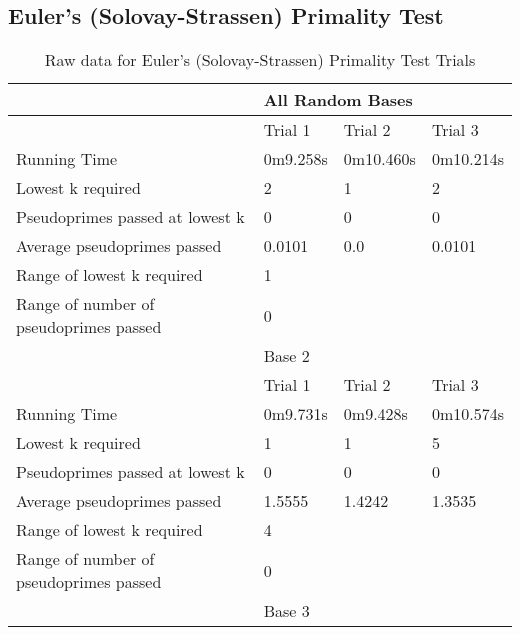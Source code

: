 \documentclass{article}
\begin{document}
\begin{appendices}
\subsection{Euler's (Solovay-Strassen) Primality Test}
\FloatBarrier
\begin{longtable}{llll}
\caption{Raw data for Euler's (Solovay-Strassen) Primality Test Trials\label{table:euler}}\\ 
\toprule
                                       & \multicolumn{3}{l}{All Random Bases}   \\
\midrule
                                       & Trial 1   & Trial 2   & Trial 3        \\
Running Time                           & 0m9.258s  & 0m10.460s & 0m10.214s      \\
Lowest k required                      & 2         & 1         & 2              \\
Pseudoprimes passed at lowest k        & 0         & 0         & 0              \\
Average pseudoprimes passed            & 0.0101    & 0.0       & 0.0101         \\
\cmidrule(lr){2-2}\cmidrule(lr){3-3}\cmidrule(lr){4-4}
Range of lowest k required             & \multicolumn{3}{l}{1}                  \\
Range of number of pseudoprimes passed & \multicolumn{3}{l}{0}                  \\
\midrule
                                       & \multicolumn{3}{l}{Base 2}             \\
\midrule
                                       & Trial 1   & Trial 2   & Trial 3        \\
Running Time                           & 0m9.731s  & 0m9.428s  & 0m10.574s      \\
Lowest k required                      & 1         & 1         & 5              \\
Pseudoprimes passed at lowest k        & 0         & 0         & 0              \\
Average pseudoprimes passed            & 1.5555    & 1.4242    & 1.3535         \\
\cmidrule(lr){2-2}\cmidrule(lr){3-3}\cmidrule(lr){4-4}
Range of lowest k required             & \multicolumn{3}{l}{4}                  \\
Range of number of pseudoprimes passed & \multicolumn{3}{l}{0}                  \\
\midrule
                                       & \multicolumn{3}{l}{Base 3}             \\

\end{longtable}
\end{appendices}
\end{document}

